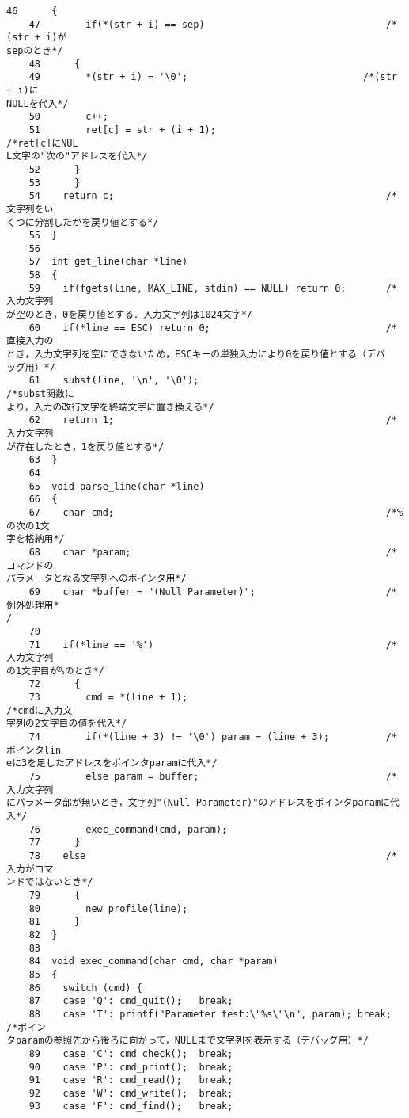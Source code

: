\begin{Verbatim}[fontsize=\small, baselinestretch=0.8]
    46	    {
    47	      if(*(str + i) == sep)                                /*(str + i)が
sepのとき*/
    48		{
    49		  *(str + i) = '\0';                               /*(str + i)に
NULLを代入*/
    50		  c++;
    51		  ret[c] = str + (i + 1);                          /*ret[c]にNUL
L文字の"次の"アドレスを代入*/
    52		}
    53	    }
    54	  return c;                                                /*文字列をい
くつに分割したかを戻り値とする*/
    55	}
    56	
    57	int get_line(char *line)
    58	{
    59	  if(fgets(line, MAX_LINE, stdin) == NULL) return 0;       /*入力文字列
が空のとき，0を戻り値とする．入力文字列は1024文字*/
    60	  if(*line == ESC) return 0;                               /*直接入力の
とき，入力文字列を空にできないため，ESCキーの単独入力により0を戻り値とする（デバ
ッグ用）*/
    61	  subst(line, '\n', '\0');                                 /*subst関数に
より，入力の改行文字を終端文字に置き換える*/
    62	  return 1;                                                /*入力文字列
が存在したとき，1を戻り値とする*/
    63	}
    64	
    65	void parse_line(char *line)
    66	{
    67	  char cmd;                                                /*%の次の1文
字を格納用*/
    68	  char *param;                                             /*コマンドの
パラメータとなる文字列へのポインタ用*/
    69	  char *buffer = "(Null Parameter)";                       /*例外処理用*
/
    70	
    71	  if(*line == '%')                                         /*入力文字列
の1文字目が%のとき*/
    72	    {
    73	      cmd = *(line + 1);                                   /*cmdに入力文
字列の2文字目の値を代入*/
    74	      if(*(line + 3) != '\0') param = (line + 3);          /*ポインタlin
eに3を足したアドレスをポインタparamに代入*/
    75	      else param = buffer;                                 /*入力文字列
にパラメータ部が無いとき，文字列"(Null Parameter)"のアドレスをポインタparamに代
入*/
    76	      exec_command(cmd, param);
    77	    }
    78	  else                                                     /*入力がコマ
ンドではないとき*/
    79	    {
    80	      new_profile(line);
    81	    }
    82	}
    83	
    84	void exec_command(char cmd, char *param)
    85	{
    86	  switch (cmd) {
    87	  case 'Q': cmd_quit();   break;
    88	  case 'T': printf("Parameter test:\"%s\"\n", param); break;   /*ポイン
タparamの参照先から後ろに向かって，NULLまで文字列を表示する（デバッグ用）*/
    89	  case 'C': cmd_check();  break;
    90	  case 'P': cmd_print();  break;
    91	  case 'R': cmd_read();   break;
    92	  case 'W': cmd_write();  break;
    93	  case 'F': cmd_find();   break;

\end{Verbatim}
